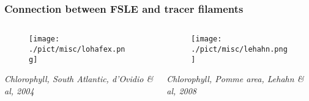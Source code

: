 \documentclass[compress,slidescentered,notes=show]{beamer}
\newcommand{\legende}[1]{\textit{\footnotesize #1}}
\begin{document}
\begin{frame}
  \frametitle{Connection between FSLE and tracer filaments}
  \begin{columns}
    \begin{column}{0.49\textwidth}
      \begin{figure}
        \texttt{[image: ./pict/misc/lohafex.png]}
      \end{figure}
      \legende{Chlorophyll, South Atlantic, d'Ovidio \& al, 2004} 
    \end{column}
    \begin{column}{0.49\textwidth}
      \begin{figure}
        \texttt{[image: ./pict/misc/lehahn.png]}
      \end{figure}
      \legende{Chlorophyll, Pomme area, Lehahn \& al, 2008}
    \end{column}
  \end{columns}
\end{frame}
%
\end{document}
